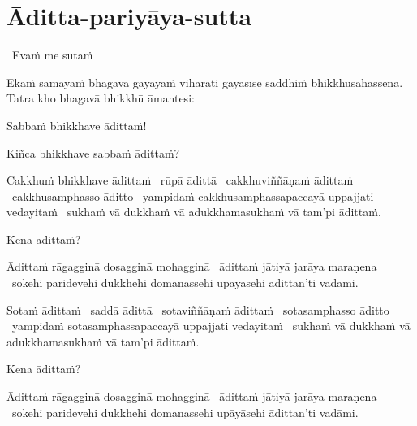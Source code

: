\section{Āditta-pariyāya-sutta}
\label{aditta-pariyaya}

\begin{leader}
  \anglebracketleft\ \hspace{-0.5mm}Evaṁ me sutaṁ \hspace{-0.5mm}\anglebracketright\
\end{leader}

\begin{pali-hang}
  Ekaṁ samayaṁ bhagavā gayāyaṁ viharati gayāsīse saddhiṁ bhikkhusahassena. Tatra kho bhagavā bhikkhū āmantesi:
\end{pali-hang}

Sabbaṁ bhikkhave ādittaṁ!

Kiñca bhikkhave sabbaṁ ādittaṁ?

\begin{pali-hang}
  Cakkhuṁ bhikkhave ādittaṁ \breathmark\ rūpā ādittā \breathmark\ cakkhuviññāṇaṁ ādittaṁ \breathmark\ cakkhusamphasso āditto \breathmark\ yampidaṁ cakkhusamphassapaccayā uppajjati vedayitaṁ \breathmark\ sukhaṁ vā dukkhaṁ vā adukkhamasukhaṁ vā tam'pi ādittaṁ.
\end{pali-hang}
\begin{pali-hangtogether}
Kena ādittaṁ?
\end{pali-hangtogether}
\begin{pali-hangtogether}
  Ādittaṁ rāgagginā dosagginā mohagginā \breathmark\ ādittaṁ jātiyā jarāya maraṇena \breathmark\ sokehi paridevehi dukkhehi domanassehi upāyāsehi ādittan'ti vadāmi.
\end{pali-hangtogether}

\begin{pali-hang}
  Sotaṁ ādittaṁ \breathmark\ saddā ādittā \breathmark\ sotaviññāṇaṁ ādittaṁ \breathmark\ sotasamphasso āditto \breathmark\ yampidaṁ sotasamphassapaccayā uppajjati vedayitaṁ \breathmark\ sukhaṁ vā dukkhaṁ vā adukkhamasukhaṁ vā tam'pi ādittaṁ.
\end{pali-hang}
\begin{pali-hangtogether}
Kena ādittaṁ?
\end{pali-hangtogether}
\begin{pali-hangtogether}
  Ādittaṁ rāgagginā dosagginā mohagginā \breathmark\ ādittaṁ jātiyā jarāya maraṇena \breathmark\ sokehi paridevehi dukkhehi domanassehi upāyāsehi ādittan'ti vadāmi.
\end{pali-hangtogether}

